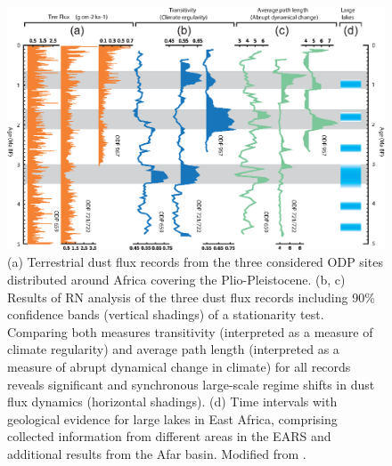 		\begin{figure}[htbp]
		\centering
			\includegraphics[width=\textwidth]{Chapter06_Applications/appl_recurrence_network.eps}
		\caption{(a) Terrestrial dust flux records from the three considered ODP sites distributed around Africa covering the Plio-Pleistocene. (b, c) Results of RN analysis of the three dust flux records including 90\% confidence bands (vertical shadings) of a stationarity test. Comparing both measures transitivity (interpreted as a measure of climate regularity) and average path length (interpreted as a measure of abrupt dynamical change in climate) for all records reveals significant and synchronous large-scale regime shifts in dust flux dynamics (horizontal shadings). (d) Time intervals with geological evidence for large lakes in East Africa, comprising collected information from different areas in the EARS and additional results from the Afar basin. Modified from \cite{Donges2011a}. } \label{fig:appl_recurrence_network}
		\end{figure}

